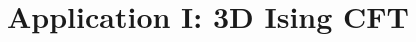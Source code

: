 \documentclass[xcolor=table, 11pt, aspectratio=169]{beamer}
\begin{document}
\section{Application I: 3D Ising CFT}
\end{document}
